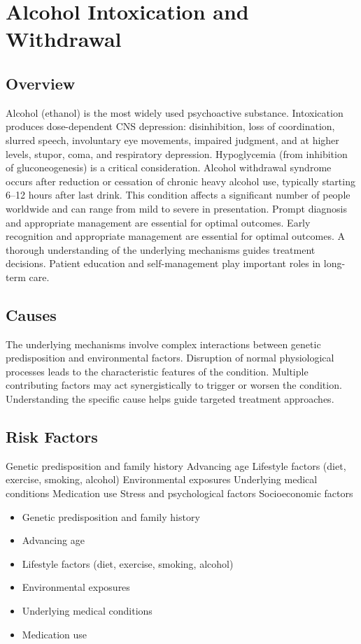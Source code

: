 \chapter{Alcohol Intoxication and Withdrawal}
\label{sec:Alcohol Intoxication and Withdrawal}

\section{Overview}
Alcohol (ethanol) is the most widely used psychoactive substance. Intoxication produces dose-dependent CNS depression: disinhibition, loss of coordination, slurred speech, involuntary eye movements, impaired judgment, and at higher levels, stupor, coma, and respiratory depression. Hypoglycemia (from inhibition of gluconeogenesis) is a critical consideration. Alcohol withdrawal syndrome occurs after reduction or cessation of chronic heavy alcohol use, typically starting 6--12 hours after last drink. This condition affects a significant number of people worldwide and can range from mild to severe in presentation. Prompt diagnosis and appropriate management are essential for optimal outcomes. Early recognition and appropriate management are essential for optimal outcomes. A thorough understanding of the underlying mechanisms guides treatment decisions. Patient education and self-management play important roles in long-term care.
\section{Causes}
The underlying mechanisms involve complex interactions between genetic predisposition and environmental factors. Disruption of normal physiological processes leads to the characteristic features of the condition. Multiple contributing factors may act synergistically to trigger or worsen the condition. Understanding the specific cause helps guide targeted treatment approaches.
\section{Risk Factors}
Genetic predisposition and family history Advancing age Lifestyle factors (diet, exercise, smoking, alcohol) Environmental exposures Underlying medical conditions Medication use Stress and psychological factors Socioeconomic factors

\begin{itemize}[noitemsep]
  \item Genetic predisposition and family history
  \item Advancing age
  \item Lifestyle factors (diet, exercise, smoking, alcohol)
  \item Environmental exposures
  \item Underlying medical conditions
  \item Medication use
\end{itemize}
